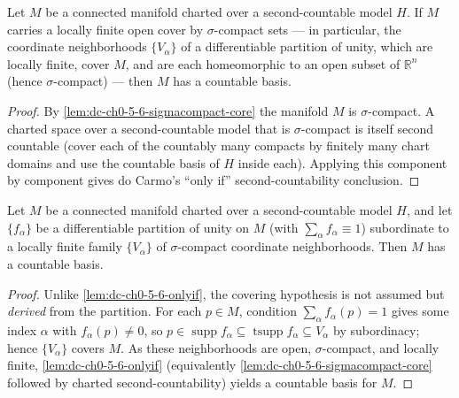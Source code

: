 \begin{lemma}
  \label{lem:dc-ch0-5-6-onlyif}
  \leanok
  Let $M$ be a connected manifold charted over a second-countable model $H$. If $M$
  carries a locally finite open cover by $\sigma$-compact sets — in particular, the
  coordinate neighborhoods $\{V_\alpha\}$ of a differentiable partition of unity,
  which are locally finite, cover $M$, and are each homeomorphic to an open subset
  of $\mathbb{R}^n$ (hence $\sigma$-compact) — then $M$ has a countable basis.
\end{lemma}
\begin{proof}
  \leanok
  By \cref{lem:dc-ch0-5-6-sigmacompact-core} the manifold $M$ is $\sigma$-compact.
  A charted space over a second-countable model that is $\sigma$-compact is itself
  second countable (cover each of the countably many compacts by finitely many chart
  domains and use the countable basis of $H$ inside each). Applying this component by
  component gives do Carmo's ``only if'' second-countability conclusion.
\end{proof}

\begin{lemma}
  \label{lem:dc-ch0-5-6-onlyif-pou}
  \leanok
  Let $M$ be a connected manifold charted over a second-countable model $H$, and let
  $\{f_\alpha\}$ be a differentiable partition of unity on $M$ (with $\sum_\alpha f_\alpha
  \equiv 1$) subordinate to a locally finite family $\{V_\alpha\}$ of $\sigma$-compact
  coordinate neighborhoods. Then $M$ has a countable basis.
\end{lemma}
\begin{proof}
  \leanok
  Unlike \cref{lem:dc-ch0-5-6-onlyif}, the covering hypothesis is not assumed but
  \emph{derived} from the partition. For each $p\in M$, condition $\sum_\alpha f_\alpha(p)=1$
  gives some index $\alpha$ with $f_\alpha(p)\neq0$, so $p\in\operatorname{supp}f_\alpha
  \subseteq\operatorname{tsupp}f_\alpha\subseteq V_\alpha$ by subordinacy; hence
  $\{V_\alpha\}$ covers $M$. As these neighborhoods are open, $\sigma$-compact, and locally
  finite, \cref{lem:dc-ch0-5-6-onlyif} (equivalently
  \cref{lem:dc-ch0-5-6-sigmacompact-core} followed by charted second-countability) yields a
  countable basis for $M$.
\end{proof}

